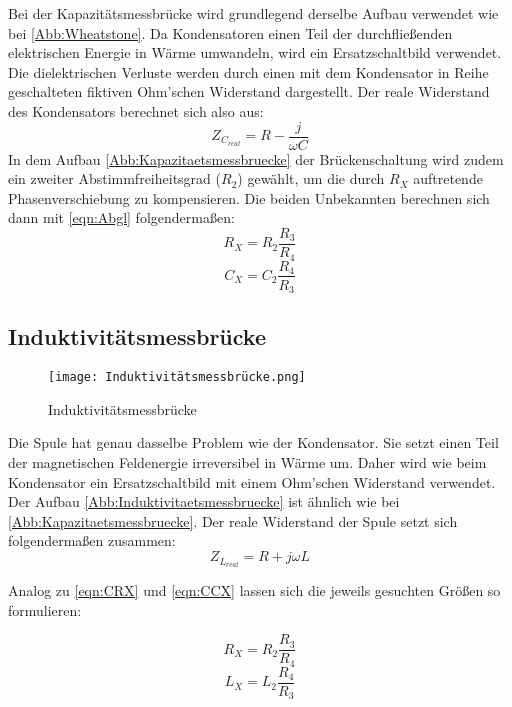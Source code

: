 Bei der Kapazitätsmessbrücke wird grundlegend derselbe Aufbau verwendet wie bei \autoref{Abb:Wheatstone}. Da Kondensatoren einen Teil der durchfließenden 
elektrischen Energie in Wärme umwandeln, wird ein Ersatzschaltbild verwendet. Die dielektrischen Verluste werden durch einen mit dem Kondensator in Reihe geschalteten
fiktiven Ohm'schen Widerstand dargestellt. Der reale Widerstand des Kondensators berechnet sich also aus:
\begin{equation*}
    Z_{C_{real}} = R - \frac{j}{\omega C}
\end{equation*}
In dem Aufbau \autoref{Abb:Kapazitaetsmessbruecke} der Brückenschaltung wird zudem ein zweiter Abstimmfreiheitsgrad ($R_2$) gewählt, um die durch $R_X$ 
auftretende Phasenverschiebung zu kompensieren.
Die beiden Unbekannten berechnen sich dann mit \autoref{eqn:Abgl} folgendermaßen:
\begin{equation}
    R_X = R_2 \frac{R_3}{R_4} \label{eqn:CRX}
\end{equation}
\begin{equation}
    C_X = C_2 \frac{R_4}{R_3} \label{eqn:CCX}
\end{equation}

\subsection{Induktivitätsmessbrücke}

\begin{figure}
    \centering
    \texttt{[image: Induktivitätsmessbrücke.png]}
    \caption{Induktivitätsmessbrücke \cite{Blatt}}
    \label{Abb:Induktivitaetsmessbruecke}
\end{figure}

Die Spule hat genau dasselbe Problem wie der Kondensator. Sie setzt einen Teil der magnetischen Feldenergie irreversibel in Wärme um. Daher wird wie beim Kondensator
ein Ersatzschaltbild mit einem Ohm'schen Widerstand verwendet. Der Aufbau \autoref{Abb:Induktivitaetsmessbruecke} ist ähnlich wie bei \autoref{Abb:Kapazitaetsmessbruecke}.
Der reale Widerstand der Spule setzt sich folgendermaßen zusammen:
\begin{equation*}
    Z_{L_{real}} = R + j \omega L
\end{equation*}
 
Analog zu \autoref{eqn:CRX} und \autoref{eqn:CCX} lassen sich die jeweils gesuchten Größen so formulieren:

\begin{equation}
    R_X = R_2 \frac{R_3}{R_4} \label{eqn:LRX}
\end{equation}
\begin{equation}
    L_X = L_2 \frac{R_4}{R_3} \label{eqn:LLX}
\end{equation}

